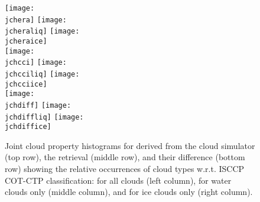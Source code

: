 

\begin{figure}[!ht]
  \centering
  \texttt{[image: \\jchera]} 
  \texttt{[image: \\jcheraliq]}
  \texttt{[image: \\jcheraice]} \\
  \texttt{[image: \\jchcci]}
  \texttt{[image: \\jchcciliq]}
  \texttt{[image: \\jchcciice]} \\
  \texttt{[image: \\jchdiff]}
  \texttt{[image: \\jchdiffliq]}
  \texttt{[image: \\jchdiffice]}
  \caption[Joint cloud proptery histograms.]
  {Joint cloud property histograms for {\MonthYear} derived from the cloud simulator 
  (top row), the {\cci} retrieval (middle row), and their difference (bottom row) showing
  the relative occurrences of cloud types w.r.t. ISCCP COT-CTP classification: 
  for all clouds (left column), 
  for water clouds only (middle column), and 
  for ice clouds only (right column).} \label{fig:jch}
\end{figure}
